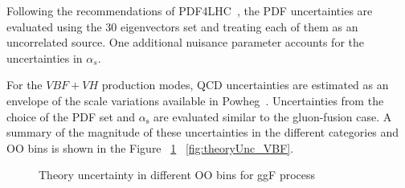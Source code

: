 Following the recommendations of PDF4LHC~\cite{pdf4lhc}, the PDF uncertainties are evaluated using the 30 eigenvectors set and treating each of them as an uncorrelated source. One additional nuisance parameter accounts for the uncertainties in $\alpha_{s}$.

For the $VBF+VH$ production modes, QCD uncertainties are estimated as an envelope of the scale variations available in Powheg~\cite{Nason:2009ai,VBFVH_theoryUnc}. Uncertainties from the choice of the PDF set and $\alpha_\mathrm{s}$ are evaluated similar to the gluon-fusion case.
A summary of the magnitude of these uncertainties in the different categories and OO bins is shown in the Figure ~\ref{fig:theoryUnc_ggF} ~\ref{fig:theoryUnc_VBF}.
\begin{figure}[htbp]
\centering
  \caption{Theory uncertainty in different OO bins for ggF process}
  \label{fig:theoryUnc_ggF}
\end{figure}

